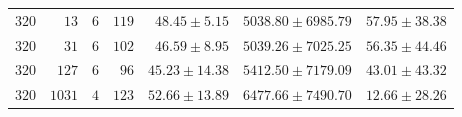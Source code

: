 \begin{tabular}{@{}rrrrrrr@{}}
  $320$ & $13$ & $6$ & $119$ & $48.45\mathbin{\pm}5.15$ & $5038.80\mathbin{\pm}6985.79$ & $57.95\mathbin{\pm}38.38$ \\
  $320$ & $31$ & $6$ & $102$ & $46.59\mathbin{\pm}8.95$ & $5039.26\mathbin{\pm}7025.25$ & $56.35\mathbin{\pm}44.46$ \\
  $320$ & $127$ & $6$ & $96$ & $45.23\mathbin{\pm}14.38$ & $5412.50\mathbin{\pm}7179.09$ & $43.01\mathbin{\pm}43.32$ \\
  $320$ & $1031$ & $4$ & $123$ & $52.66\mathbin{\pm}13.89$ & $6477.66\mathbin{\pm}7490.70$ & $12.66\mathbin{\pm}28.26$ \\
  \bottomrule
\end{tabular}

